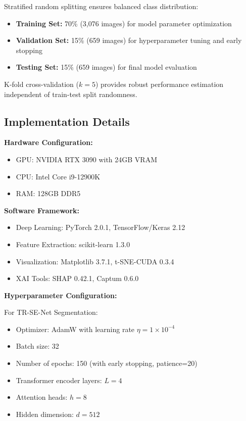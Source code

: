 \documentclass[11pt,a4paper]{article}
\begin{document}
Stratified random splitting ensures balanced class distribution:
\begin{itemize}
\item \textbf{Training Set:} 70\% (3,076 images) for model parameter optimization
\item \textbf{Validation Set:} 15\% (659 images) for hyperparameter tuning and early stopping
\item \textbf{Testing Set:} 15\% (659 images) for final model evaluation
\end{itemize}

K-fold cross-validation ($k=5$) provides robust performance estimation independent of train-test split randomness.

\subsection{Implementation Details}

\textbf{Hardware Configuration:}
\begin{itemize}
\item GPU: NVIDIA RTX 3090 with 24GB VRAM
\item CPU: Intel Core i9-12900K
\item RAM: 128GB DDR5
\end{itemize}

\textbf{Software Framework:}
\begin{itemize}
\item Deep Learning: PyTorch 2.0.1, TensorFlow/Keras 2.12
\item Feature Extraction: scikit-learn 1.3.0
\item Visualization: Matplotlib 3.7.1, t-SNE-CUDA 0.3.4
\item XAI Tools: SHAP 0.42.1, Captum 0.6.0
\end{itemize}

\textbf{Hyperparameter Configuration:}

For TR-SE-Net Segmentation:
\begin{itemize}
\item Optimizer: AdamW with learning rate $\eta = 1 \times 10^{-4}$
\item Batch size: 32
\item Number of epochs: 150 (with early stopping, patience=20)
\item Transformer encoder layers: $L = 4$
\item Attention heads: $h = 8$
\item Hidden dimension: $d = 512$
\end{itemize}
\end{document}
